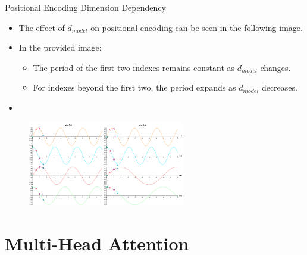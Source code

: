 \documentclass[serif, aspectratio=169]{beamer}
\begin{document}
\begin{frame}{Positional Encoding Dimension Dependency}
	\begin{itemize}
			\item The effect of \( d_{model} \) on positional encoding can be seen in the following image.
			\item In the provided image:
				\begin{itemize}
					\item The period of the first two indexes remains constant as \( d_{model} \) changes.
					\item For indexes beyond the first two, the period expands as \( d_{model} \) decreases.
				\end{itemize}
			\item 
		
	\end{itemize}
	\vspace{-5pt}
	\begin{figure}
		\centering
		\includegraphics[width=0.61\textwidth]{pic/dimension-comparision.png}
		\label{fig:positional-encoding-1-1}
	\end{figure}
	\vspace{5pt}
	\vfill
{}
\end{frame}

\section{Multi-Head Attention}
\end{document}
